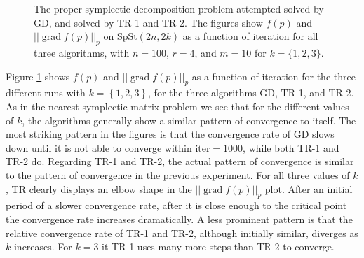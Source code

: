\begin{figure}
    \caption[The proper symplectic decomposition problem]{The proper symplectic decomposition problem attempted solved by GD, and solved by TR-1 and TR-2. The figures show $f(p)$ and $\lvert \lvert \operatorname{grad}f(p) \rvert \rvert_{p}$ on $\mathrm{SpSt}(2n, 2k)$ as a function of iteration for all three algorithms, with $n=100$, $r=4$, and $m=10$ for $k=\{1,2,3\}$.}
    \label{fig:symplectic_decomposition}
\end{figure}
%
Figure \ref{fig:symplectic_decomposition} shows $f(p)$ and $\lvert \lvert \operatorname{grad}f(p) \rvert \rvert_{p}$ as a function of iteration for the three different runs with $k=\left\{ 1,2,3 \right\}$, for the three algorithms GD, TR-1, and TR-2. As in the nearest symplectic matrix problem we see that for the different values of $k$, the algorithms generally show a similar pattern of convergence to itself. The most striking pattern in the figures is that the convergence rate of GD slows down until it is not able to  converge within $\text{iter}=1000$, while both TR-1 and TR-2 do. Regarding TR-1 and TR-2, the actual pattern of convergence is similar to the pattern of convergence in the previous experiment. For all three values of $k$, TR clearly displays an elbow shape in the $\lvert \lvert \operatorname{grad}f(p) \rvert \rvert_{p}$ plot. After an initial period of a slower convergence rate, after it is close enough to the critical point the convergence rate increases dramatically. A less prominent pattern is that the relative convergence rate of TR-1 and TR-2, although initially similar, diverges as $k$ increases. For $k=3$ it TR-1 uses many more steps than TR-2 to converge. 

